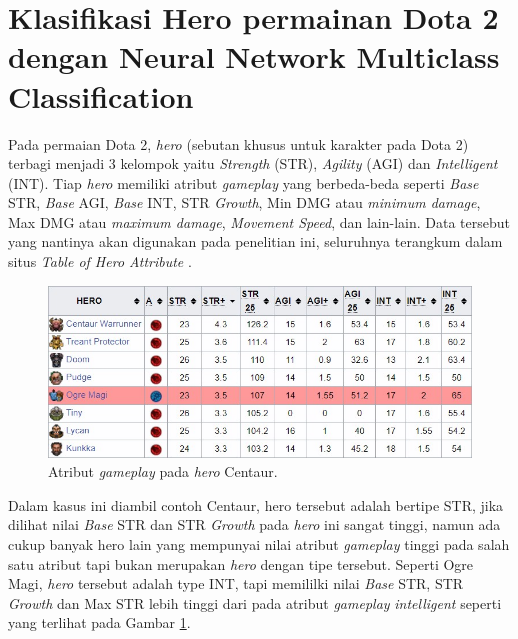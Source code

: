 \section{Klasifikasi Hero permainan Dota 2 dengan Neural Network Multiclass Classification}
\label{sec:sec3_dota2_method}
\vspace{1ex}

Pada permaian Dota 2, \textit{hero} (sebutan khusus untuk karakter pada Dota 2) terbagi menjadi 3 kelompok yaitu \textit{Strength} (STR), \textit{Agility} (AGI) dan \textit{Intelligent} (INT). Tiap \textit{hero} memiliki atribut \textit{gameplay} yang berbeda-beda seperti \textit{Base} STR, \textit{Base} AGI, \textit{Base} INT, STR \textit{Growth}, Min DMG atau \textit{minimum damage}, Max DMG atau \textit{maximum damage}, \textit{Movement Speed}, dan lain-lain. Data tersebut yang nantinya akan digunakan pada penelitian ini, seluruhnya terangkum dalam situs \textit{Table of Hero Attribute} \citep{dota2020}.
\vspace{1ex}

\begin{figure} [!h] \centering
	\includegraphics[scale=0.52]{img/centa.jpg}
	\caption{Atribut \textit{gameplay} pada \textit{hero} Centaur.}
	\label{fig:centa}
\end{figure}

Dalam kasus ini diambil contoh Centaur, hero tersebut adalah bertipe STR, jika dilihat nilai \textit{Base} STR dan STR \textit{Growth} pada \textit{hero} ini sangat tinggi, namun ada cukup banyak hero lain yang mempunyai nilai atribut \textit{gameplay} tinggi pada salah satu atribut tapi bukan merupakan \textit{hero} dengan tipe tersebut. Seperti Ogre Magi, \textit{hero} tersebut adalah type INT, tapi memililki nilai \textit{Base} STR, STR \textit{Growth} dan Max STR lebih tinggi dari pada atribut \textit{gameplay} \textit{intelligent} seperti yang terlihat pada Gambar \ref{fig:centa}. 
\vspace{1ex}

